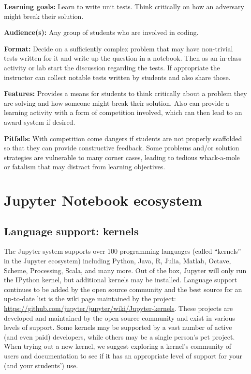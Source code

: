 \documentclass[]{book}
\begin{document}
\textbf{Learning goals:} Learn to write unit tests. Think critically on
how an adversary might break their solution.

\textbf{Audience(s):} Any group of students who are involved in coding.

\textbf{Format:} Decide on a sufficiently complex problem that may have
non-trivial tests written for it and write up the question in a
notebook. Then as an in-class activity or lab start the discussion
regarding the tests. If appropriate the instructor can collect notable
tests written by students and also share those.

\textbf{Features:} Provides a means for students to think critically
about a problem they are solving and how someone might break their
solution. Also can provide a learning activity with a form of
competition involved, which can then lead to an award system if desired.

\textbf{Pitfalls:} With competition come dangers if students are not
properly scaffolded so that they can provide constructive feedback. Some
problems and/or solution strategies are vulnerable to many corner cases,
leading to tedious whack-a-mole or fatalism that may distract from
learning objectives.

\hypertarget{jupyter}{\chapter{Jupyter Notebook
ecosystem}\label{jupyter}}

\section{Language support: kernels}\label{language-support-kernels}

The Jupyter system supports over 100 programming languages (called
``kernels'' in the Jupyter ecosystem) including Python, Java, R, Julia,
Matlab, Octave, Scheme, Processing, Scala, and many more. Out of the
box, Jupyter will only run the IPython kernel, but additional kernels
may be installed. Language support continues to be added by the open
source community and the best source for an up-to-date list is the wiki
page maintained by the project:
\url{https://github.com/jupyter/jupyter/wiki/Jupyter-kernels}. These
projects are developed and maintained by the open source community and
exist in various levels of support. Some kernels may be supported by a
vast number of active (and even paid) developers, while others may be a
single person's pet project. When trying out a new kernel, we suggest
exploring a kernel's community of users and documentation to see if it
has an appropriate level of support for your (and your students') use.
\end{document}
